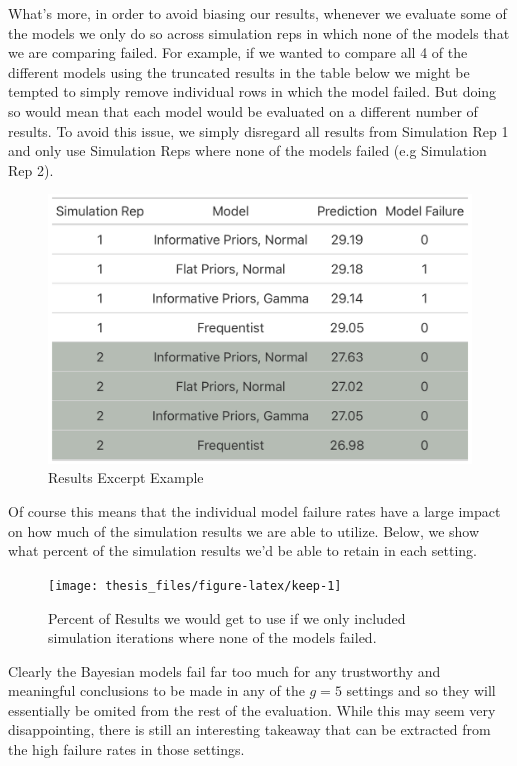 \documentclass[12pt,twoside]{reedthesis}
\begin{document}
What's more, in order to avoid biasing our results, whenever we evaluate some of the models we only do so across simulation reps in which none of the models that we are comparing failed. For example, if we wanted to compare all 4 of the different models using the truncated results in the table below we might be tempted to simply remove individual rows in which the model failed. But doing so would mean that each model would be evaluated on a different number of results. To avoid this issue, we simply disregard all results from Simulation Rep 1 and only use Simulation Reps where none of the models failed (e.g Simulation Rep 2).
\begin{figure}

{\centering \includegraphics[width=0.95\linewidth]{figure/tb1} 

}

\caption{Results Excerpt Example}\label{fig:tbl}
\end{figure}
Of course this means that the individual model failure rates have a large impact on how much of the simulation results we are able to utilize. Below, we show what percent of the simulation results we'd be able to retain in each setting.
\begin{figure}

{\centering \texttt{[image: thesis\_files/figure-latex/keep-1]} 

}

\caption{Percent of Results we would get to use if we only included simulation iterations where none of the models failed.}\label{fig:keep}
\end{figure}
Clearly the Bayesian models fail far too much for any trustworthy and meaningful conclusions to be made in any of the \(g = 5\) settings and so they will essentially be omited from the rest of the evaluation. While this may seem very disappointing, there is still an interesting takeaway that can be extracted from the high failure rates in those settings.
\end{document}
